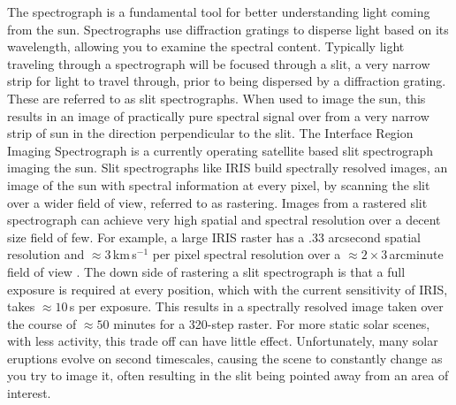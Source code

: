 The spectrograph is a fundamental tool for better understanding light coming from the sun. 
Spectrographs use diffraction gratings to disperse light based on its wavelength, allowing you to examine the spectral content.
Typically light traveling through a spectrograph will be focused through a slit, a very narrow strip for light to travel through, prior to being dispersed by a diffraction grating.
These are referred to as slit spectrographs.  
When used to image the sun, this results in an image of practically pure spectral signal over from a very narrow strip of sun in the direction perpendicular to the slit.
The Interface Region Imaging Spectrograph \citep[IRIS:][]{IRIS} is a currently operating satellite based slit spectrograph imaging the sun.
Slit spectrographs like IRIS build spectrally resolved images, an image of the sun with spectral information at every pixel, by scanning the slit over a wider field of view, referred to as rastering.
Images from a rastered slit spectrograph can achieve very high spatial and spectral resolution over a decent size field of few.
For example, a large IRIS raster has a .33 arcsecond spatial resolution and $\approx3$\,km\,s$^{-1}$ per pixel spectral resolution over a $\approx2\times3$\,arcminute field of view \citep{DePontieu2021}.
The down side of rastering a slit spectrograph is that a full exposure is required at every position, which with the current sensitivity of IRIS, takes $\approx10$\,s per exposure.
This results in a spectrally resolved image taken over the course of $\approx50$ minutes for a 320-step raster. 
For more static solar scenes, with less activity, this trade off can have little effect.
Unfortunately, many solar eruptions evolve on second timescales, causing the scene to constantly change as you try to image it, often resulting in the slit being pointed away from an area of interest.

